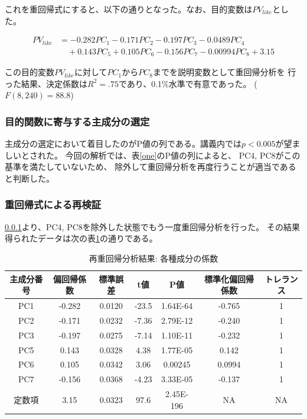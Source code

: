 \documentclass[11pt,a4paper, uplatex]{jsarticle}
\begin{document}
これを重回帰式にすると、以下の通りとなった。なお、目的変数は$ PV_{like} $とした。

\begin{equation}
  \begin{split}
    PV_{like} &= -0.282PC_1 - 0.171PC_2 - 0.197PC_3 - 0.0489PC_4 \\
    &\quad + 0.143PC_5 + 0.105PC_6 - 0.156PC_7 - 0.00994PC_8 + 3.15
  \end{split}
\end{equation}

この目的変数$ PV_{like} $に対して$ PC_1 $から$ PC_8 $までを説明変数として重回帰分析を
行った結果、決定係数は$ R^2 = .75 $であり、0.1\%水準で有意であった。
($ F(8, 240) = 88.8 $)

\subsubsection{目的関数に寄与する主成分の選定}
\label{onesec}

主成分の選定において着目したのがP値の列である。講義内では$ p < 0.005 $が望ましいとされた。
今回の解析では、表\ref{one}のP値の列によると、
PC4, PC8がこの基準を満たしていないため、
除外して重回帰分析を再度行うことが適当であると判断した。

\subsubsection{重回帰式による再検証}
\ref{onesec}より、PC4, PC8を除外した状態でもう一度重回帰分析を行った。
その結果得られたデータは次の表\ref{two}の通りである。

\begin{table}[htbp]
  \begin{center}
    \caption{再重回帰分析結果: 各種成分の係数}
    \begin{tabular}{c|c|c|c|c|c|c}
      \hline
      主成分番号 & 偏回帰係数 & 標準誤差 & t値 & P値 & 標準化偏回帰係数 & トレランス \\ \hline \hline
      PC1 & -0.282 & 0.0120 & -23.5 & 1.64E-64 & -0.765 & 1 \\
      PC2 & -0.171 & 0.0232 & -7.36 & 2.79E-12 & -0.240 & 1 \\
      PC3 & -0.197 & 0.0275 & -7.14 & 1.10E-11 & -0.232 & 1 \\
      PC5 & 0.143 & 0.0328 & 4.38 & 1.77E-05 & 0.142 & 1 \\
      PC6 & 0.105 & 0.0342 & 3.06 & 0.00245 & 0.0994 & 1 \\
      PC7 & -0.156 & 0.0368 & -4.23 & 3.33E-05 & -0.137 & 1 \\
      定数項 & 3.15 & 0.0323 & 97.6 & 2.45E-196 & NA & NA \\
    \end{tabular}
    \label{two}
  \end{center}
\end{table}
\end{document}
